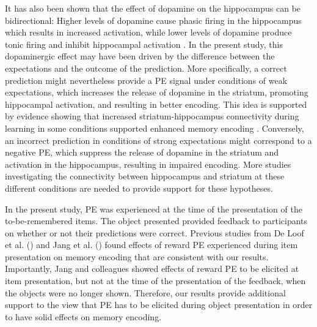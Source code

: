 \documentclass[a4paper,12pt]{article}
\begin{document}
It has also been shown that the effect of dopamine on the hippocampus can be bidirectional: Higher levels of dopamine cause phasic firing in the hippocampus which results in increased activation, while lower levels of dopamine produce tonic firing and inhibit hippocampal activation \citep{rosen2015midbrain}. In the present study, this dopaminergic effect may have been driven by the difference between the expectations and the outcome of the prediction. More specifically, a correct prediction might nevertheless provide a PE signal under conditions of weak expectations, which increases the release of dopamine in the striatum, promoting hippocampal activation, and resulting in better encoding. This idea is supported by evidence showing that increased striatum-hippocampus connectivity during learning in some conditions supported enhanced memory encoding \citep{Davidow2016}. Conversely, an incorrect prediction in conditions of strong expectations might correspond to a negative PE, which suppress the release of dopamine in the striatum and activation in the hippocampus, resulting in impaired encoding. More studies investigating the connectivity between hippocampus and striatum at these different conditions are needed to provide support for these hypotheses. 
\par 
In the present study, PE was experienced at the time of the presentation of the to-be-remembered items. The object presented provided feedback to participants on whether or not their predictions were correct. Previous studies from De Loof et al. (\citeyear{de2018signed}) and Jang et al. (\citeyear{Jang2019}) found effects of reward PE experienced during item presentation on memory encoding that are consistent with our results. Importantly, Jang and colleagues showed effects of reward PE to be elicited at item presentation, but not at the time of the presentation of the feedback, when the objects were no longer shown. Therefore, our results provide additional support to the view that PE has to be elicited during object presentation in order to have solid effects on memory encoding. 
\par
\end{document}
